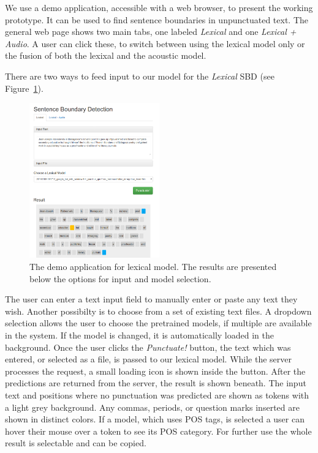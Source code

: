 We use a demo application, accessible with a web browser, to present the working prototype.
It can be used to find sentence boundaries in unpunctuated text.
The general web page shows two main tabs, one labeled \emph{Lexical} and one \emph{Lexical + Audio}.
A user can click these, to switch between using the lexical model only or the fusion of both the lexixal and the acoustic model.

There are two ways to feed input to our model for the \emph{Lexical} SBD (see Figure~\ref{fig:demo_l}).
\begin{figure}[ht]
    \centering
    \includegraphics[width=0.5\textwidth]{img/demo_l.png}
    \caption{The demo application for lexical model. The results are presented below the options for input and model selection.}
    \label{fig:demo_l}
\end{figure}
The user can enter a text input field to manually enter or paste any text they wish.
Another possibilty is to choose from a set of existing text files.
A dropdown selection allows the user to choose the pretrained models, if multiple are available in the system.
If the model is changed, it is automatically loaded in the background.
Once the user clicks the \emph{Punctuate!} button, the text which was entered, or selected as a file, is passed to our lexical model.
While the server processes the request, a small loading icon is shown inside the button.
After the predictions are returned from the server, the result is shown beneath.
The input text and positions where no punctuation was predicted are shown as tokens with a light grey background.
Any commas, periods, or question marks inserted are shown in distinct colors.
If a model, which uses POS tags, is selected a user can hover their mouse over a token to see its POS category.
For further use the whole result is selectable and can be copied.

